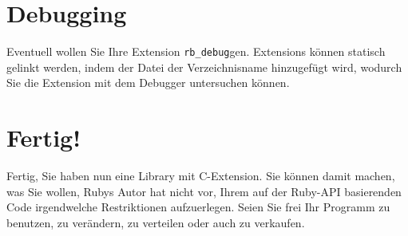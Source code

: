 \section{Debugging}
\label{sec:debugging}


Eventuell wollen Sie Ihre Extension \verb+rb_debug+gen. Extensions
können statisch gelinkt werden, indem der Datei  der
Verzeichnisname hinzugefügt wird, wodurch Sie die Extension mit dem
Debugger untersuchen können.

\section{Fertig!}
\label{sec:fertig}

Fertig, Sie haben nun eine Library mit C-Extension. Sie können damit
machen, was Sie wollen, Rubys Autor hat nicht vor, Ihrem auf der
Ruby-API basierenden Code irgendwelche Restriktionen
aufzuerlegen. Seien Sie frei Ihr Programm zu benutzen, zu verändern,
zu verteilen oder auch zu verkaufen.

